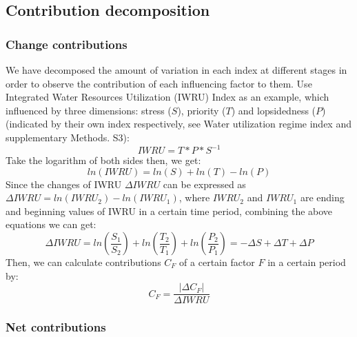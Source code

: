 \documentclass[9pt, twocolumn, twoside, lineno]{pnas-new}
\begin{document}
{	%
	\subsection*{Contribution decomposition}
	\subsubsection*{Change contributions}
		We have decomposed the amount of variation in each index at different stages in order to observe the contribution of each influencing factor to them. Use Integrated Water Resources Utilization (IWRU) Index as an example, which influenced by three dimensions: stress ($S$), priority ($T$) and lopsidedness ($P$) (indicated by their own index respectively, see Water utilization regime index and supplementary Methods. S3):
		$$ IWRU = T * P * S ^ {-1} $$
		Take the logarithm of both sides then, we get:
		$$ ln(IWRU) = ln(S) + ln(T) - ln(P) $$
		Since the changes of IWRU $\Delta IWRU$ can be expressed as $\Delta IWRU = ln(IWRU_2) - ln(IWRU_1)$, where $IWRU_2$ and $IWRU_1$ are ending and beginning values of IWRU in a certain time period, combining the above equations we can get:
		$$ \Delta IWRU = ln(\frac{S_1}{S_2}) + ln(\frac{T_2}{T_1}) + ln(\frac{P_2}{P_1}) = -\Delta S + \Delta T + \Delta P $$
		Then, we can calculate contributions $C_F$ of a certain factor $F$ in a certain period by:
		$$ C_{F} = \frac{|\Delta C_{F}|}{\Delta IWRU}$$
		
	\subsubsection*{Net contributions}
		}

\showmatmethods{} %


\showacknow{} %


	
\end{document}
